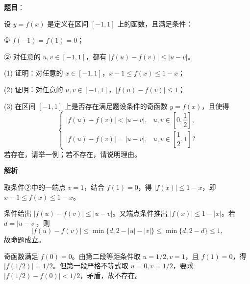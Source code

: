 \begin{answer}

\textbf{题目}：

设 \(y=f(x)\) 是定义在区间 \([-1,1]\) 上的函数，且满足条件：

    ① \(f(-1)=f(1)=0\)；

    ② 对任意的 \(u,v\in[-1,1]\)，都有 \(|f(u)-f(v)|\le |u-v|\)。

    (1) 证明：对任意的 \(x\in[-1,1]\)，\(x-1\le f(x)\le 1-x\)；

    (2) 证明：对任意的 \(u,v\in[-1,1]\)，\(|f(u)-f(v)|\le 1\)；

    (3) 在区间 \([-1,1]\) 上是否存在满足题设条件的奇函数 \(y=f(x)\)，且使得
\nopagebreak[4]
\[
    \begin{cases}
    |f(u)-f(v)|<|u-v|,&u,v\in\left[0,\dfrac12\right],\\
    |f(u)-f(v)|=|u-v|,&u,v\in\left[\dfrac12,1\right]?
    \end{cases}
\]
    若存在，请举一例；若不存在，请说明理由。

\textbf{解析}


取条件②中的一端点 \(v=1\)，结合 \(f(1)=0\)，得 \(|f(x)|\le1-x\)，即 \(x-1\le f(x)\le1-x\)。


条件给出 \(|f(u)-f(v)|\le|u-v|\)。又端点条件推出 \(|f(x)|\le1-|x|\)。若 \(d=|u-v|\)，则
\nopagebreak[4]
\[
|f(u)-f(v)|\le\min\{d,2-|u|-|v|\}\le\min\{d,2-d\}\le1,
\]
故命题成立。


奇函数满足 \(f(0)=0\)。由第二段等距条件取 \(u=1/2,v=1\)，且 \(f(1)=0\)，得 \(|f(1/2)|=1/2\)。但第一段严格不等式取 \(u=0,v=1/2\)，要求 \(|f(1/2)-f(0)|<1/2\)，矛盾，故不存在。




\end{answer}